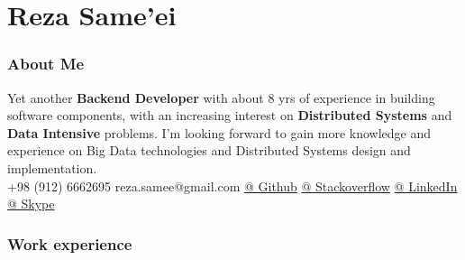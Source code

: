 \documentclass{tccv}
\begin{document}
\part{Reza Same'ei}

\section{About Me}
Yet another \textbf{Backend Developer} with about 8 yrs of experience in building software components, with an increasing interest on \textbf{Distributed Systems} and ​\textbf{Data Intensive} problems. I’m looking forward to gain more knowledge and experience on Big Data technologies and Distributed Systems design and implementation.\\

  {+98 (912) 6662695}
  {reza.samee@gmail.com}
  {\href{https://github.com/sameei}{@ Github}}
  {\href{https://stackoverflow.com/users/998642/reza-sameei}{@ Stackoverflow}}
  {\href{http://linkedin.com/in/reza-sameei/}{@ LinkedIn}}
  {\href{https://join.skype.com/invite/nINGOAMPxZdX}{@ Skype}}

\section{Work experience}
\end{document}
